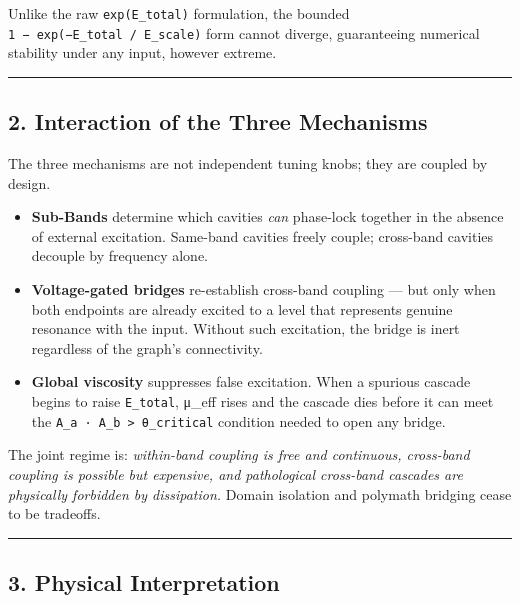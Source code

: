\documentclass[
  11pt,
  a4paper,
]{article}
\providecommand{\tightlist}{%
  \setlength{\itemsep}{0pt}\setlength{\parskip}{0pt}}
\begin{document}
Unlike the raw \texttt{exp(E\_total)} formulation, the bounded
\texttt{1\ −\ exp(−E\_total\ /\ E\_scale)} form cannot diverge,
guaranteeing numerical stability under any input, however extreme.

\begin{center}\rule{0.5\linewidth}{0.5pt}\end{center}

\subsection{2. Interaction of the Three
Mechanisms}\label{interaction-of-the-three-mechanisms}

The three mechanisms are not independent tuning knobs; they are coupled
by design.

\begin{itemize}
\tightlist
\item
  \textbf{Sub-Bands} determine which cavities \emph{can} phase-lock
  together in the absence of external excitation. Same-band cavities
  freely couple; cross-band cavities decouple by frequency alone.
\item
  \textbf{Voltage-gated bridges} re-establish cross-band coupling ---
  but only when both endpoints are already excited to a level that
  represents genuine resonance with the input. Without such excitation,
  the bridge is inert regardless of the graph's connectivity.
\item
  \textbf{Global viscosity} suppresses false excitation. When a spurious
  cascade begins to raise \texttt{E\_total}, μ\_eff rises and the
  cascade dies before it can meet the
  \texttt{A\_a\ ·\ A\_b\ \textgreater{}\ θ\_critical} condition needed
  to open any bridge.
\end{itemize}

The joint regime is: \emph{within-band coupling is free and continuous,
cross-band coupling is possible but expensive, and pathological
cross-band cascades are physically forbidden by dissipation.} Domain
isolation and polymath bridging cease to be tradeoffs.

\begin{center}\rule{0.5\linewidth}{0.5pt}\end{center}

\subsection{3. Physical Interpretation}\label{physical-interpretation}
\end{document}
